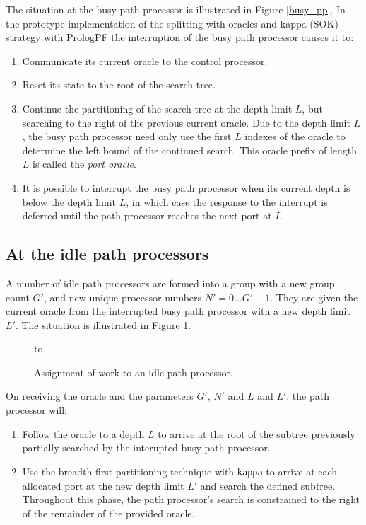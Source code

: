 \enlargethispage{-\baselineskip}  %
The situation at the busy path processor is illustrated in Figure \ref{busy_pp}.
In the prototype implementation of the splitting with oracles and kappa
(SOK) strategy with
PrologPF the interruption of the busy path processor causes it to:
\begin{enumerate}
\item{Communicate its current oracle to the control processor.}
\item{Reset its state
  to the root of the search tree.}
\item{Continue the partitioning of the search tree at the depth limit $L$, but
  searching to the right of the previous current oracle.  Due to the depth limit
  $L$, the busy path processor need only use the first $L$ indexes of the oracle
  to determine the left bound of the continued search.  This oracle prefix of 
  length $L$ is called the \textit{port oracle}.}
\item{It is possible to interrupt the busy path processor when its current 
  depth is below the
  depth limit $L$, in which case the response to the interrupt is deferred until
  the path processor reaches the next port at $L$.}
\end{enumerate}


\subsection{At the idle path processors}

A number of idle path processors are formed into a group with a new group
count $G'$, and new unique processor numbers $N'=0\ldots G'-1$.  They are
given the current oracle from the interrupted busy path processor with a
new depth limit $L'$.   The situation is illustrated in Figure \ref{idle_pp}.

\begin{figure}[htb]
\vspace{5mm} \hbox to 
\caption{Assignment of work to an idle path processor.}
\vspace{5mm}
\label{idle_pp}
\end{figure}

On receiving the oracle and the parameters $G'$, $N'$ and $L$ and $L'$, the path 
processor will:
\begin{enumerate}
\item{Follow the oracle to a depth $L$ to arrive at the root of the subtree
  previously partially searched by the interupted busy path processor.}
\item{Use the breadth-first partitioning technique with \texttt{kappa} to
  arrive at each allocated port at the new depth limit $L'$ and search the
  defined subtree.  Throughout this phase, the path processor's search 
  is constrained to the right of the remainder of the provided
  oracle.}
\end{enumerate}

